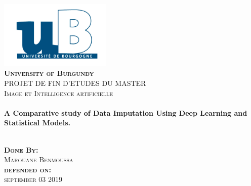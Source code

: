 \documentclass[11pt]{report}           %
\begin{document}
\begin{titlepage}
\begin{center}

\includegraphics[width=0.4\textwidth]{img/logoUniv}~\\[1cm]

\textsc{\LARGE \bfseries University of Burgundy }\\[1.1cm]


\textsc{\Large PROJET DE FIN D’ETUDES DU MASTER}\\[0.3cm]

\textsc{\Large Image et Intelligence artificielle }\\[0.2cm]

\HRule \\[0.1cm]

{\huge \bfseries A Comparative study of Data Imputation Using Deep Learning and Statistical Models.\\[0.6cm] }

\HRule \\[0.1cm]

\textsc{\bfseries Done By:}\\%
\textsc{\large Marouane Benmoussa}\\[0.2cm]

\textsc{\Large \bfseries defended on:}\\%
\textsc{\large september 03  2019}\\[0.1cm]

%


\end{center}
\end{titlepage}
\end{document}
